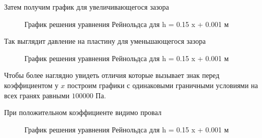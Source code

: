 \documentclass[a4paper,14pt]{extarticle}
\begin{document}
Затем получим график для увеличивающегося зазора
\begin{figure}[!htbp]
	\caption{График решения уравнения Рейнольдса для h = 0.15 x + 0.001 м}
	\label{sol_pos_h}
\end{figure}

Так выглядит давление на пластину для уменьшающегося зазора
\begin{figure}[!htbp]
	\caption{График решения уравнения Рейнольдса для h = 0.15 x + 0.001 м}
	\label{sol_neg_h}
\end{figure}

Чтобы более наглядно увидеть отличия которые вызывает знак перед коэффициентом у $x$ построим графики с одинаковыми граничными условиями на всех гранях равными $100000$ Па.

При положительном коэффициенте видимо провал
\begin{figure}[!htbp]
	\caption{График решения уравнения Рейнольдса для h = 0.15 x + 0.001 м}
	\label{sol_pos_h}
\end{figure}
\end{document}
